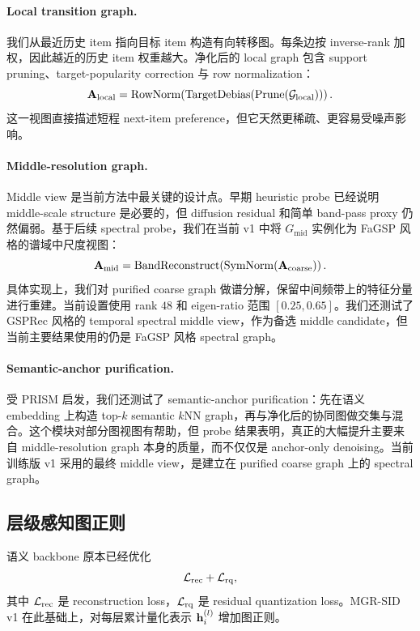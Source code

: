 \paragraph{Local transition graph.}
我们从最近历史 item 指向目标 item 构造有向转移图。每条边按 inverse-rank 加权，因此越近的历史 item 权重越大。净化后的 local graph 包含 support pruning、target-popularity correction 与 row normalization：
\begin{equation}
\mathbf{A}_{\mathrm{local}} = \mathrm{RowNorm}\!\left( \mathrm{TargetDebias}\!\left( \mathrm{Prune}(\mathcal{G}_{\mathrm{local}}) \right)\right).
\end{equation}
这一视图直接描述短程 next-item preference，但它天然更稀疏、更容易受噪声影响。

\paragraph{Middle-resolution graph.}
Middle view 是当前方法中最关键的设计点。早期 heuristic probe 已经说明 middle-scale structure 是必要的，但 diffusion residual 和简单 band-pass proxy 仍然偏弱。基于后续 spectral probe，我们在当前 v1 中将 $G_{\mathrm{mid}}$ 实例化为 FaGSP 风格的谱域中尺度视图：
\begin{equation}
\mathbf{A}_{\mathrm{mid}} = \mathrm{BandReconstruct}\!\left( \mathrm{SymNorm}(\mathbf{A}_{\mathrm{coarse}})\right).
\end{equation}
具体实现上，我们对 purified coarse graph 做谱分解，保留中间频带上的特征分量进行重建。当前设置使用 rank $48$ 和 eigen-ratio 范围 $[0.25, 0.65]$。我们还测试了 GSPRec 风格的 temporal spectral middle view，作为备选 middle candidate，但当前主要结果使用的仍是 FaGSP 风格 spectral graph。

\paragraph{Semantic-anchor purification.}
受 PRISM 启发，我们还测试了 semantic-anchor purification：先在语义 embedding 上构造 top-$k$ semantic $k$NN graph，再与净化后的协同图做交集与混合。这个模块对部分图视图有帮助，但 probe 结果表明，真正的大幅提升主要来自 middle-resolution graph 本身的质量，而不仅仅是 anchor-only denoising。当前训练版 v1 采用的最终 middle view，是建立在 purified coarse graph 上的 spectral graph。

\subsection{层级感知图正则}

语义 backbone 原本已经优化
\begin{equation}
\mathcal{L}_{\mathrm{rec}} + \mathcal{L}_{\mathrm{rq}},
\end{equation}
其中 $\mathcal{L}_{\mathrm{rec}}$ 是 reconstruction loss，$\mathcal{L}_{\mathrm{rq}}$ 是 residual quantization loss。MGR-SID v1 在此基础上，对每层累计量化表示 $\mathbf{h}_i^{(l)}$ 增加图正则。

